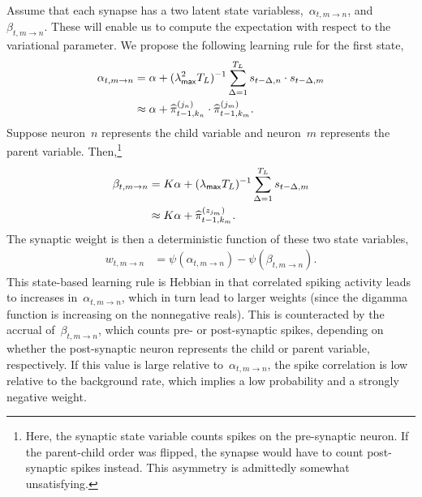 Assume that each synapse has a two latent state
variabless,~$\alpha_{t, m \to n}$, and~$\beta_{t,m \to n}$. These will
enable us to compute the expectation with respect to the variational
parameter.  We propose the following learning rule for the first
state,
\begin{align*}
  \alpha_{t, m \to n} &=
  \alpha +
  (\lambda_{\mathsf{max}}^2 T_L)^{-1}  \sum_{\Delta = 1}^{T_L} s_{t-\Delta ,n} \cdot s_{t-\Delta,m} \\
  &\approx \alpha + \widehat{\pi}_{t-1,k_n}^{(j_n)} \cdot \widehat{\pi}_{t-1,k_m}^{(j_m)}. 
\end{align*}
Suppose neuron~$n$ represents the child variable and neuron~$m$
represents the parent variable. Then,\footnote{Here, the synaptic state
  variable counts spikes on the pre-synaptic neuron.  If the
  parent-child order was flipped, the synapse would have to count
  post-synaptic spikes instead. This asymmetry is admittedly somewhat
  unsatisfying.  }
\begin{align*}
  \beta_{t,m \to n} &= K\alpha + (\lambda_{\mathsf{max}} T_L)^{-1} \sum_{\Delta = 1}^{T_L} s_{t -\Delta, m} \\
  &\approx K\alpha + \widehat{\pi}_{t-1,k_m}^{(z_{j_m})}.
\end{align*}
The synaptic weight is then a deterministic function of these two state variables,
\begin{align*}
  w_{t, m \to n} &= \psi(\alpha_{t, m \to n}) - \psi(\beta_{t, m \to n}).
\end{align*}
This state-based learning rule is Hebbian in that correlated spiking
activity leads to increases in~$\alpha_{t,m \to n}$, which in turn
lead to larger weights (since the digamma function is increasing on
the nonnegative reals).
This is counteracted by the accrual of~$\beta_{t, m \to n}$, which
counts pre- or post-synaptic spikes, depending on whether the
post-synaptic neuron represents the child or parent variable, respectively.
If this value is large relative to~$\alpha_{t, m \to n}$, the
spike correlation is low relative to the background rate, which
implies a low probability and a strongly negative weight. 

